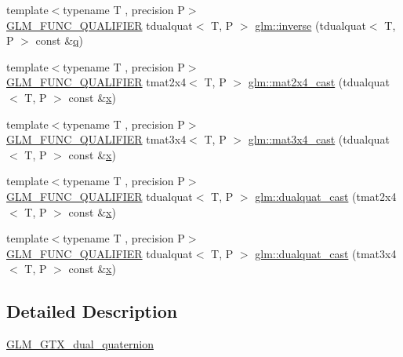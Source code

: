 \begin{DoxyCompactItemize}
{\footnotesize template$<$typename T , precision P$>$ }\\\mbox{\hyperlink{setup_8hpp_a33fdea6f91c5f834105f7415e2a64407}{G\+L\+M\+\_\+\+F\+U\+N\+C\+\_\+\+Q\+U\+A\+L\+I\+F\+I\+ER}} tdualquat$<$ T, P $>$ \mbox{\hyperlink{group__gtx__dual__quaternion_ga2149d3cb8af04d9530de0cd16aa1aab2}{glm\+::inverse}} (tdualquat$<$ T, P $>$ const \&\mbox{\hyperlink{glad_8h_a514729309336df22bcc8eda979d6ced4}{q}})
\item 
{\footnotesize template$<$typename T , precision P$>$ }\\\mbox{\hyperlink{setup_8hpp_a33fdea6f91c5f834105f7415e2a64407}{G\+L\+M\+\_\+\+F\+U\+N\+C\+\_\+\+Q\+U\+A\+L\+I\+F\+I\+ER}} tmat2x4$<$ T, P $>$ \mbox{\hyperlink{group__gtx__dual__quaternion_ga2d124748183e12db8288eeaca350298e}{glm\+::mat2x4\+\_\+cast}} (tdualquat$<$ T, P $>$ const \&\mbox{\hyperlink{glad_8h_a92d0386e5c19fb81ea88c9f99644ab1d}{x}})
\item 
{\footnotesize template$<$typename T , precision P$>$ }\\\mbox{\hyperlink{setup_8hpp_a33fdea6f91c5f834105f7415e2a64407}{G\+L\+M\+\_\+\+F\+U\+N\+C\+\_\+\+Q\+U\+A\+L\+I\+F\+I\+ER}} tmat3x4$<$ T, P $>$ \mbox{\hyperlink{group__gtx__dual__quaternion_ga576745d979e3c079a64152490c816954}{glm\+::mat3x4\+\_\+cast}} (tdualquat$<$ T, P $>$ const \&\mbox{\hyperlink{glad_8h_a92d0386e5c19fb81ea88c9f99644ab1d}{x}})
\item 
{\footnotesize template$<$typename T , precision P$>$ }\\\mbox{\hyperlink{setup_8hpp_a33fdea6f91c5f834105f7415e2a64407}{G\+L\+M\+\_\+\+F\+U\+N\+C\+\_\+\+Q\+U\+A\+L\+I\+F\+I\+ER}} tdualquat$<$ T, P $>$ \mbox{\hyperlink{group__gtx__dual__quaternion_gada9799afe2b62394dc498534beb5bc78}{glm\+::dualquat\+\_\+cast}} (tmat2x4$<$ T, P $>$ const \&\mbox{\hyperlink{glad_8h_a92d0386e5c19fb81ea88c9f99644ab1d}{x}})
\item 
{\footnotesize template$<$typename T , precision P$>$ }\\\mbox{\hyperlink{setup_8hpp_a33fdea6f91c5f834105f7415e2a64407}{G\+L\+M\+\_\+\+F\+U\+N\+C\+\_\+\+Q\+U\+A\+L\+I\+F\+I\+ER}} tdualquat$<$ T, P $>$ \mbox{\hyperlink{group__gtx__dual__quaternion_ga20eb5758beb73cc6dbc2d9104f03ec20}{glm\+::dualquat\+\_\+cast}} (tmat3x4$<$ T, P $>$ const \&\mbox{\hyperlink{glad_8h_a92d0386e5c19fb81ea88c9f99644ab1d}{x}})
\end{DoxyCompactItemize}


\subsection{Detailed Description}
\mbox{\hyperlink{group__gtx__dual__quaternion}{G\+L\+M\+\_\+\+G\+T\+X\+\_\+dual\+\_\+quaternion}} 